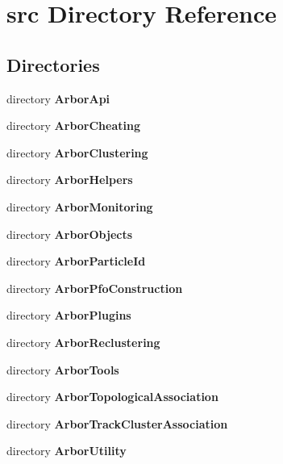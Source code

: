 \section{src Directory Reference}
\label{dir_68267d1309a1af8e8297ef4c3efbcdba}
\subsection*{Directories}
\begin{DoxyCompactItemize}
\item 
directory {\bf Arbor\+Api}
\item 
directory {\bf Arbor\+Cheating}
\item 
directory {\bf Arbor\+Clustering}
\item 
directory {\bf Arbor\+Helpers}
\item 
directory {\bf Arbor\+Monitoring}
\item 
directory {\bf Arbor\+Objects}
\item 
directory {\bf Arbor\+Particle\+Id}
\item 
directory {\bf Arbor\+Pfo\+Construction}
\item 
directory {\bf Arbor\+Plugins}
\item 
directory {\bf Arbor\+Reclustering}
\item 
directory {\bf Arbor\+Tools}
\item 
directory {\bf Arbor\+Topological\+Association}
\item 
directory {\bf Arbor\+Track\+Cluster\+Association}
\item 
directory {\bf Arbor\+Utility}
\end{DoxyCompactItemize}
